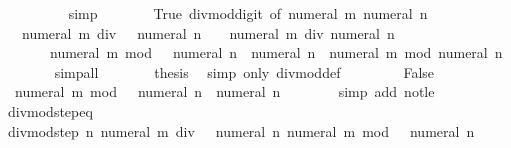 \begin{isabellebody}
\ \ \ \ \ \ \ \ \isamarkupfalse%
\ simp\isanewline
\ \ \ \ \isamarkupfalse%
\ \isamarkupfalse%
\ True\ divmod{\isacharunderscore}{\kern0pt}digit{\isacharunderscore}{\kern0pt}{}\ {\isacharbrackleft}{\kern0pt}of\ {\isachardoublequoteopen}numeral\ m{\isachardoublequoteclose}\ {\isachardoublequoteopen}numeral\ n{\isachardoublequoteclose}{\isacharbrackright}{\kern0pt}\isanewline
\ \ \ \ \ \ \isamarkupfalse%
\ {\isachardoublequoteopen}{}\ {\isacharasterisk}{\kern0pt}\ {\isacharparenleft}{\kern0pt}numeral\ m\ div\ {\isacharparenleft}{\kern0pt}{}\ {\isacharasterisk}{\kern0pt}\ numeral\ n{\isacharparenright}{\kern0pt}{\isacharparenright}{\kern0pt}\ {\isacharplus}{\kern0pt}\ {}\ {\isacharequal}{\kern0pt}\ numeral\ m\ div\ numeral\ n{\isachardoublequoteclose}\isanewline
\ \ \ \ \ \ \ {\isachardoublequoteopen}numeral\ m\ mod\ {\isacharparenleft}{\kern0pt}{}\ {\isacharasterisk}{\kern0pt}\ numeral\ n{\isacharparenright}{\kern0pt}\ {\isacharminus}{\kern0pt}\ numeral\ n\ {\isacharequal}{\kern0pt}\ numeral\ m\ mod\ numeral\ n{\isachardoublequoteclose}\isanewline
\ \ \ \ \ \ \isamarkupfalse%
\ simp{\isacharunderscore}{\kern0pt}all\isanewline
\ \ \ \ \isamarkupfalse%
\ \isamarkupfalse%
\ {\isacharquery}{\kern0pt}thesis\ \isamarkupfalse%
\ {\isacharparenleft}{\kern0pt}simp\ only{\isacharcolon}{\kern0pt}\ divmod{\isacharunderscore}{\kern0pt}def{\isacharparenright}{\kern0pt}\isanewline
\ \ \isamarkupfalse%
\isanewline
\ \ \ \ \isamarkupfalse%
\ False\ \isamarkupfalse%
\ \isamarkupfalse%
\ {\isacharasterisk}{\kern0pt}{\isacharcolon}{\kern0pt}\ {\isachardoublequoteopen}numeral\ m\ mod\ {\isacharparenleft}{\kern0pt}{}\ {\isacharasterisk}{\kern0pt}\ numeral\ n{\isacharparenright}{\kern0pt}\ {\isacharless}{\kern0pt}\ numeral\ n{\isachardoublequoteclose}\isanewline
\ \ \ \ \ \ \isamarkupfalse%
\ {\isacharparenleft}{\kern0pt}simp\ add{\isacharcolon}{\kern0pt}\ not{\isacharunderscore}{\kern0pt}le{\isacharparenright}{\kern0pt}\isanewline
\ \ \ \ \isamarkupfalse%
\ divmod{\isacharunderscore}{\kern0pt}step{\isacharunderscore}{\kern0pt}eq\isanewline
\ \ \ \ \ \ \isamarkupfalse%
\ {\isachardoublequoteopen}divmod{\isacharunderscore}{\kern0pt}step\ n\ {\isacharparenleft}{\kern0pt}numeral\ m\ div\ {\isacharparenleft}{\kern0pt}{}\ {\isacharasterisk}{\kern0pt}\ numeral\ n{\isacharparenright}{\kern0pt}{\isacharcomma}{\kern0pt}\ numeral\ m\ mod\ {\isacharparenleft}{\kern0pt}{}\ {\isacharasterisk}{\kern0pt}\ numeral\ n{\isacharparenright}{\kern0pt}{\isacharparenright}{\kern0pt}\ {\isacharequal}{\kern0pt}\isanewline

\end{isabellebody}
